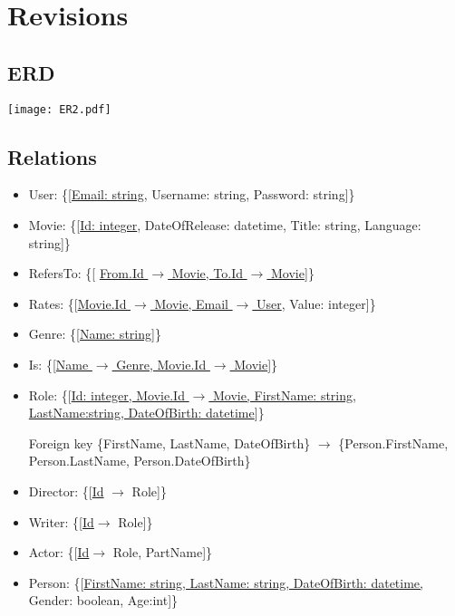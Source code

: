 \section{Revisions}

\subsection{ERD}
\texttt{[image: ER2.pdf]}

\subsection{Relations}
\begin{itemize}
\item User: \{[\underline{Email: string}, Username: string, Password: string]\}

\item Movie: \{[\underline{Id: integer}, DateOfRelease: datetime, Title: string, Language: string]\}

\item RefersTo: \{[ \underline{From.Id $\rightarrow$ Movie, To.Id $\rightarrow$ Movie}]\}

\item Rates: \{[\underline{Movie.Id $\rightarrow$ Movie, Email $ \rightarrow $ User}, Value: integer]\}

\item Genre: \{[\underline{Name: string}]\}

\item Is: \{[\underline{Name $\rightarrow$ Genre, Movie.Id $\rightarrow$ Movie}]\}

\item Role: \{[\underline{Id: integer, Movie.Id $\rightarrow$ Movie, FirstName: string},\\ \underline{LastName:string, DateOfBirth: datetime}]\}

Foreign key \{FirstName, LastName, DateOfBirth\} $ \rightarrow $ \{Person.FirstName, Person.LastName, Person.DateOfBirth\}

\item Director: \{[\underline{Id} $ \rightarrow $ Role]\}

\item Writer: \{[\underline{Id}$ \rightarrow $ Role]\}

\item Actor: \{[\underline{Id}$ \rightarrow $ Role, PartName]\}

\item Person: \{[\underline{FirstName: string, LastName: string, DateOfBirth: datetime,} Gender: boolean, Age:int]\}


\end{itemize}
